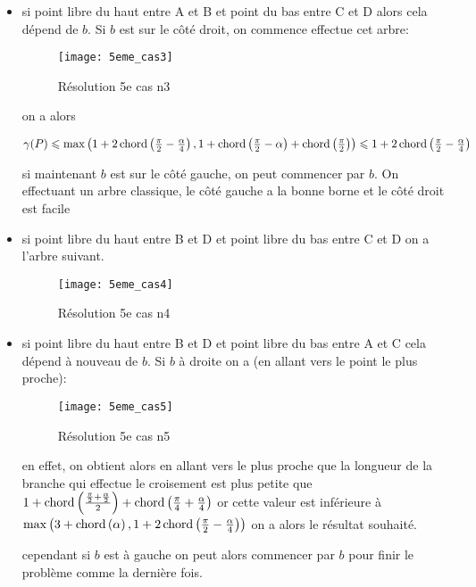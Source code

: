 \begin{itemize}
\begin{itemize}
\item si point libre du haut entre A et B et point du bas entre C et D alors cela dépend de $b$. Si $b$ est sur le côté droit, on commence effectue cet arbre:

\begin{figure}[h!]
  \centering
  \texttt{[image: 5eme\_cas3]}
  \caption{Résolution 5e cas n3}
  \label{fig:5eme_cas3}
\end{figure}

on a alors

$\gamma(P) \leqslant \max\left(1+2\operatorname{chord}\left(\frac{\pi}{2} - \frac{\alpha}{4}\right), 1 + \operatorname{chord}\left(\frac{\pi}{2} - \alpha\right) + \operatorname{chord}\left(\frac{\pi}{2}\right)\right) \leqslant 1+2\operatorname{chord}\left(\frac{\pi}{2} - \frac{\alpha}{4}\right)$

si maintenant $b$ est sur le côté gauche, on peut commencer par $b$. On effectuant un arbre classique, le côté gauche a la bonne borne et le côté droit est facile

\item si point libre du haut entre B et D et point libre du bas entre C et D on a l'arbre suivant.

\begin{figure}[h!]
  \centering
  \texttt{[image: 5eme\_cas4]}
  \caption{Résolution 5e cas n4}
  \label{fig:5eme_cas4}
\end{figure}

\item si point libre du haut entre B et D et point libre du bas entre A et C cela dépend à nouveau de $b$. Si $b$ à droite on a (en allant vers le point le plus proche):

\begin{figure}[h!]
  \centering
  \texttt{[image: 5eme\_cas5]}
  \caption{Résolution 5e cas n5}
  \label{fig:5eme_cas5}
\end{figure}

en effet, on obtient alors en allant vers le plus proche que la longueur de la branche qui effectue le croisement est plus petite que $1+\operatorname{chord}\left(\frac{\frac{\pi}{2} + \frac{\alpha}{2}}{2}\right) + \operatorname{chord}\left(\frac{\pi}{4} + \frac{\alpha}{4}\right)$ or cette valeur est inférieure à $\max\left(3 + \operatorname{chord}\left(\alpha\right), 1 + 2\operatorname{chord}\left(\frac{\pi}{2} - \frac{\alpha}{4}\right)\right)$ on a alors le résultat souhaité.

cependant si $b$ est à gauche on peut alors commencer par $b$ pour finir le problème comme la dernière fois.

\end{itemize}
\end{itemize}

